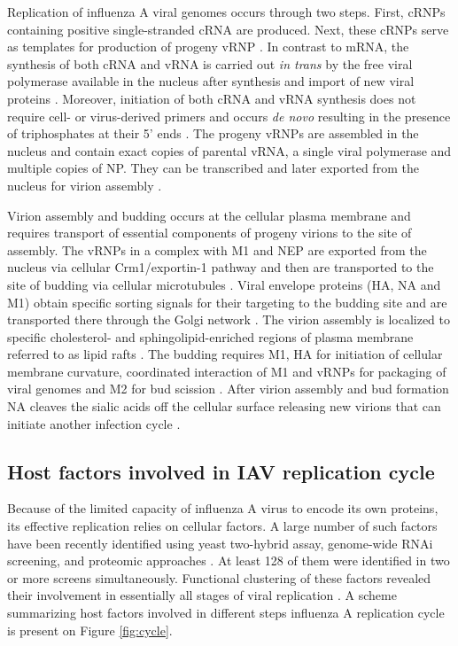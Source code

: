 	Replication of influenza A viral genomes occurs through two steps. First, \gls{cRNP}s containing positive single-stranded cRNA are produced. Next, these \gls{cRNP}s serve as templates for production of progeny \gls{vRNP} \parencite{Elton2005}. In contrast to mRNA, the synthesis of both cRNA and vRNA is carried out \textit{in trans} by the free viral polymerase available in the nucleus after synthesis and import of new viral proteins \parencite{Jorba2009, Moeller2012}. Moreover, initiation of both cRNA and vRNA synthesis does not require cell- or virus-derived primers and occurs \textit{de novo} resulting in the presence of triphosphates at their 5' ends \parencite{Hay1982, Zhang2010}. The progeny \gls{vRNP}s are assembled in the nucleus and contain exact copies of parental vRNA, a single viral polymerase and multiple copies of \gls{NP}. They can be transcribed and later exported from the nucleus for virion assembly \parencite{Resa-Infante2011}. 
	
	Virion assembly and budding occurs at the cellular plasma membrane and requires transport of essential components of progeny virions to the site of assembly. The \gls{vRNP}s in a complex with \gls{M1} and \gls{NEP} are exported from the nucleus via cellular Crm1/exportin-1 pathway and then are transported to the site of budding via cellular microtubules \parencite{Akarsu2003, Momose2007, Kawaguchi2012}. Viral envelope proteins (\gls{HA}, \gls{NA} and \gls{M1}) obtain specific sorting signals for their targeting to the budding site \parencite{Hughey1992, Kundu1996, Tall2003} and are transported there through the Golgi network \parencite{Daniels-Holgate1989}. The virion assembly is localized to specific  cholesterol- and sphingolipid-enriched regions of plasma membrane referred to as lipid rafts \parencite{Scheiffele1999}. The budding requires \gls{M1}, \gls{HA} for initiation of cellular membrane curvature, coordinated interaction of \gls{M1} and \gls{vRNP}s for packaging of viral genomes and \gls{M2} for bud scission \parencite{Nayak2009, Rossman2011}. After virion assembly and bud formation \gls{NA} cleaves the sialic acids off the cellular surface releasing new virions that can initiate another infection cycle \parencite{Barman2004}.

	
	\subsection{Host factors involved in IAV replication cycle}
	
	Because of the limited capacity of influenza A virus to encode its own proteins, its effective replication relies on cellular factors. A large number of such factors have been recently identified using yeast two-hybrid assay, genome-wide RNAi screening, and proteomic approaches \parencite{Mayer2007, Brass2009, Shapira2009, Hao2008, Karlas2010, Konig2010, Shaw2011, Song2011}. At least 128 of them were identified in two or more screens simultaneously. Functional clustering of these factors revealed their involvement in essentially all stages of viral replication \parencite{Watanabe2010}. A scheme summarizing host factors involved in different steps influenza A replication cycle is present on Figure \ref{fig:cycle}.
	
